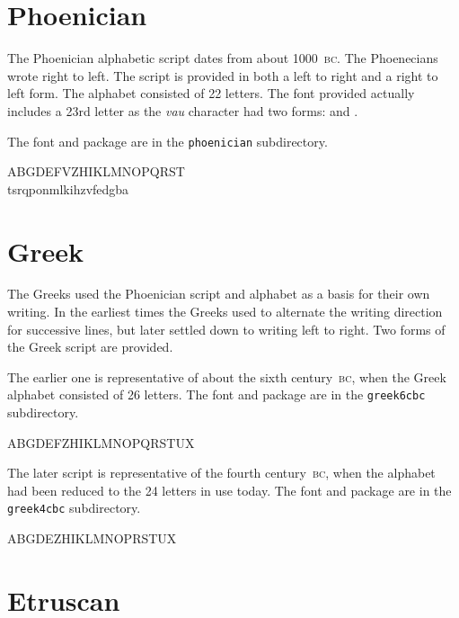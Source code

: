 \documentclass{article}
\newcommand{\BC}{\textsc{bc}}
\begin{document}
\section{Phoenician}

    The Phoenician alphabetic script dates from about 1000~\BC. 
The Phoenecians wrote right to left. The script is provided in both a
left to right and a right to left form. The alphabet consisted of
22 letters. The font provided actually includes a 23rd letter as
the \textit{vau} character had two forms:  and .

    The font and package are in the \texttt{phoenician} subdirectory.

\begin{center}
\phncfamily
ABGDEFVZH\TTheta IKLMN\TXi OP\Tsade QRST \\
tsrq\tsade po\tXi nmlki\tTheta hzvfedgba
\end{center}

\section{Greek}

    The Greeks used the Phoenician script and alphabet as a basis for their
own writing. In the earliest times the Greeks used to alternate the writing
direction for successive lines, but later settled down to writing left to 
right. Two forms of the Greek script are provided. 

The earlier one is representative of about the sixth century~\BC, when the
Greek alphabet consisted of 26 letters.
    The font and package are in the \texttt{greek6cbc} subdirectory.

\begin{center}
\gvibcfamily
ABGDEFZH\TTheta IKLMN\TXi OPQRSTUX\TPhi\TPsi\TOmega
\end{center}

   The later script is representative of the fourth century~\BC, when the
alphabet had been reduced to the 24 letters in use today.
    The font and package are in the \texttt{greek4cbc} subdirectory.

\begin{center}
\givbcfamily
ABGDEZH\TTheta IKLMN\TXi OPRSTUX\TPhi\TPsi\TOmega 
\end{center}

\section{Etruscan}
\end{document}
